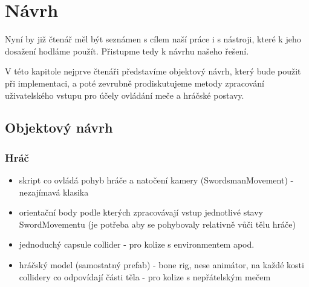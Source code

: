 \chapter{Návrh}

Nyní by již čtenář měl být seznámen s cílem naší práce i s nástroji, které k jeho dosažení hodláme použít. Přistupme tedy k návrhu našeho řešení.

V této kapitole nejprve čtenáři představíme objektový návrh, který bude použit při implementaci, a poté zevrubně prodiskutujeme metody zpracování uživatelského vstupu pro účely ovládání meče a hráčské postavy.


\section{Objektový návrh}

\subsection{Hráč}
\begin{itemize}
    \item skript co ovládá pohyb hráče a natočení kamery (SwordsmanMovement) - nezajímavá klasika
    \item orientační body podle kterých zpracovávají vstup jednotlivé stavy SwordMovementu (je potřeba aby se pohybovaly relativně vůči tělu hráče)
    \item jednoduchý capsule collider - pro kolize s environmentem apod.
    \item hráčský model (samostatný prefab) - bone rig, nese animátor, na každé kosti collidery co odpovídají části těla - pro kolize s nepřátelským mečem 
\end{itemize} 

